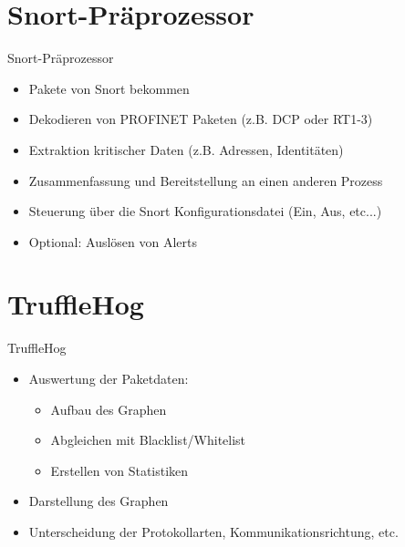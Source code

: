 \documentclass[18pt]{beamer}
\begin{document}
\section{Snort-Präprozessor}
\begin{frame}{Snort-Präprozessor}
    \begin{itemize}
      \item Pakete von Snort bekommen
      \pause
      \item Dekodieren von PROFINET Paketen (z.B. DCP oder RT1-3)
      \pause
      \item Extraktion kritischer Daten (z.B. Adressen, Identitäten)
      \pause
      \item Zusammenfassung und Bereitstellung an einen anderen Prozess
      \pause
      \item Steuerung über die Snort Konfigurationsdatei (Ein, Aus, etc...)
      \pause
      \item Optional: Auslösen von Alerts
    \end{itemize}
\end{frame}


\section{TruffleHog}
\begin{frame}{TruffleHog}
    \begin{itemize}
      \item Auswertung der Paketdaten: \pause
      \begin{itemize}
        \item Aufbau des Graphen \pause
        \item Abgleichen mit Blacklist/Whitelist \pause
        \item Erstellen von Statistiken \pause
      \end{itemize}
      
      \item Darstellung des Graphen  \pause
      \item Unterscheidung der Protokollarten, Kommunikationsrichtung, etc.
      
    \end{itemize}
\end{frame}
\end{document}
